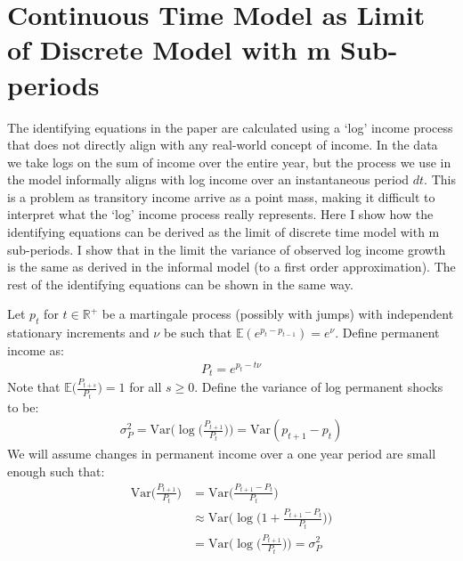 \section{Continuous Time Model as Limit of Discrete Model with m Sub-periods} \label{log_tranformation}
The identifying equations in the paper are calculated using a `log' income process that does not directly align with any real-world concept of income. In the data we take logs on the sum of income over the entire year, but the process we use in the model informally aligns with log income over an instantaneous period $dt$. This is a problem as transitory income arrive as a point mass, making it difficult to interpret what the `log' income process really represents. Here I show how the identifying equations can be derived as the limit of discrete time model with m sub-periods. I show that in the limit the variance of observed log income growth is the same as derived in the informal model (to a first order approximation). The rest of the identifying equations can be shown in the same way.

Let $p_t$ for $t\in\mathbb{R}^+$ be a martingale process (possibly with jumps) with independent stationary increments and $\nu$ be such that $\mathbb{E}(e^{p_t - p_{t-1}})=e^{\nu}$. Define permanent income as:
\begin{align*}
P_t = e^{p_t - t \nu}
\end{align*}
Note that $\mathbb{E}\Big(\frac{P_{t+s}}{P_t}\Big)=1$ for all $s\geq 0$. Define the variance of log permanent shocks to be:
\begin{align*} \sigma^2_P=\mathrm{Var}\Big(\log\big(\frac{P_{t+1}}{P_t}\big)\Big) = \mathrm{Var}(p_{t+1}-p_t)
\end{align*}
We will assume changes in permanent income over a one year period are small enough such that:
\begin{align} \mathrm{Var}\Big(\frac{P_{t+1}}{P_t}\Big) &= \mathrm{Var}\Big(\frac{P_{t+1}-P_t}{P_t}\Big) \nonumber \\
& \approx \mathrm{Var}\Big(\log\big(1+\frac{P_{t+1}-P_t}{P_t}\big)\Big) \nonumber \\
&= \mathrm{Var}\Big(\log\big(\frac{P_{t+1}}{P_t}\big)\Big) = \sigma^2_P \label{permvar_approx}
\end{align}

